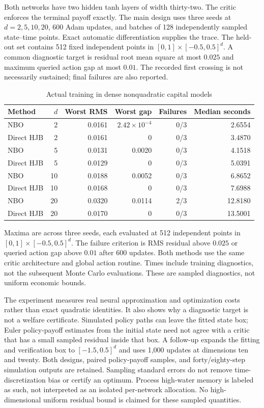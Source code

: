 \documentclass[ecta,nameyear,draft]{econsocart}
\theoremstyle{definition}
\theoremstyle{remark}
\begin{document}
Both networks have two hidden tanh layers of width thirty-two. The critic enforces the terminal payoff exactly. The main design uses three seeds at $d=2,5,10,20$, 600 Adam updates, and batches of 128 independently sampled state--time points. Exact automatic differentiation supplies the trace. The held-out set contains 512 fixed independent points in $[0,1]\times[-0.5,0.5]^d$. A common diagnostic target is residual root mean square at most $0.025$ and maximum queried action gap at most $0.01$. The recorded first crossing is not necessarily sustained; final failures are also reported.

\begin{table}[t]\centering
\caption{Actual training in dense nonquadratic capital models}\label{tab:coupled-r6}
\small\begin{tabular}{lrrrrr}
\toprule
Method & $d$ & Worst RMS & Worst gap & Failures & Median seconds\\\midrule
NBO & 2 & 0.0161 & $2.42\times10^{-4}$ & 0/3 & 2.6554\\
Direct HJB & 2 & 0.0161 & 0 & 0/3 & 3.4870\\
NBO & 5 & 0.0131 & 0.0020 & 0/3 & 4.1518\\
Direct HJB & 5 & 0.0129 & 0 & 0/3 & 5.0391\\
NBO & 10 & 0.0188 & 0.0052 & 0/3 & 6.8652\\
Direct HJB & 10 & 0.0168 & 0 & 0/3 & 7.6988\\
NBO & 20 & 0.0320 & 0.0114 & 2/3 & 12.8180\\
Direct HJB & 20 & 0.0170 & 0 & 0/3 & 13.5001\\
\bottomrule\end{tabular}
\par\smallskip\footnotesize Maxima are across three seeds, each evaluated at 512 independent points in $[0,1]\times[-0.5,0.5]^d$. The failure criterion is RMS residual above $0.025$ or queried action gap above $0.01$ after 600 updates. Both methods use the same critic architecture and global action routine. Times include training diagnostics, not the subsequent Monte Carlo evaluations. These are sampled diagnostics, not uniform economic bounds.
\end{table}


The experiment measures real neural approximation and optimization costs rather than exact quadratic identities. It also shows why a diagnostic target is not a welfare certificate. Simulated policy paths can leave the fitted state box; Euler policy-payoff estimates from the initial state need not agree with a critic that has a small sampled residual inside that box. A follow-up expands the fitting and verification box to $[-1.5,0.5]^d$ and uses 1,000 updates at dimensions ten and twenty. Both designs, paired policy-payoff samples, and forty/eighty-step simulation outputs are retained. Sampling standard errors do not remove time-discretization bias or certify an optimum. Process high-water memory is labeled as such, not interpreted as an isolated per-network allocation. No high-dimensional uniform residual bound is claimed for these sampled quantities.
\end{document}
